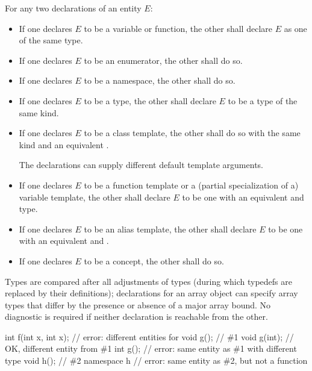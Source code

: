 \pnum
{}%
%
For any two declarations of an entity $E$:
\begin{itemize}
\item
If one declares $E$ to be a variable or function,
the other shall declare $E$ as one of the same type.
\item
If one declares $E$ to be an enumerator, the other shall do so.
\item
If one declares $E$ to be a namespace, the other shall do so.
\item
If one declares $E$ to be a type,
the other shall declare $E$ to be a type of the same kind.
\item
If one declares $E$ to be a class template,
the other shall do so with the same kind and
an equivalent .
\begin{note}
The declarations can supply different default template arguments.
\end{note}
\item
If one declares $E$ to be a function template or
a (partial specialization of a) variable template,
the other shall declare $E$ to be one
with an equivalent  and type.
\item
If one declares $E$ to be an alias template,
the other shall declare $E$ to be one with
an equivalent  and .
\item
If one declares $E$ to be a concept, the other shall do so.
\end{itemize}
Types are compared after all adjustments of types (during which
typedefs are replaced by their definitions);
declarations for an array
object can specify array types that differ by the presence or absence of
a major array bound.
No diagnostic is required if neither declaration is reachable from the other.
\begin{example}
\begin{codeblock}
int f(int x, int x);    // error: different entities for 
void g();               // \#1
void g(int);            // OK, different entity from \#1
int g();                // error: same entity as \#1 with different type
void h();               // \#2
namespace h {}          // error: same entity as \#2, but not a function
\end{codeblock}
\end{example}


